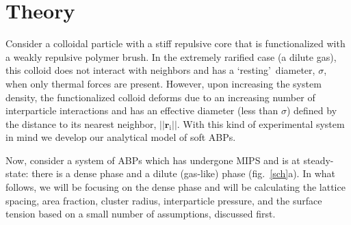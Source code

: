 \documentclass[twoside,twocolumn,9pt]{article}
\begin{document}
\section{Theory} \label{analytical}

Consider a colloidal particle with a stiff repulsive core that is functionalized with a weakly repulsive polymer brush. In the extremely rarified case (a dilute gas), this colloid does not interact with neighbors and has a \lq resting\rq \ diameter, $\sigma$, when only thermal forces are present. However, upon increasing the system density, the functionalized colloid deforms due to an increasing number of interparticle interactions and has an effective diameter (less than $\sigma$) defined by the distance to its nearest neighbor, $||\mathbf{r}_\text{i}||$. With this kind of experimental system in mind we develop our analytical model of soft ABPs. 

Now, consider a system of ABPs which has undergone MIPS and is at steady-state: there is a dense phase and a dilute (gas-like) phase (fig.~\ref{sch}a).  In what follows, we will be focusing on the dense phase and will be calculating the lattice spacing, area fraction, cluster radius, interparticle pressure, and the surface tension based on a small number of assumptions, discussed first. 
\end{document}

